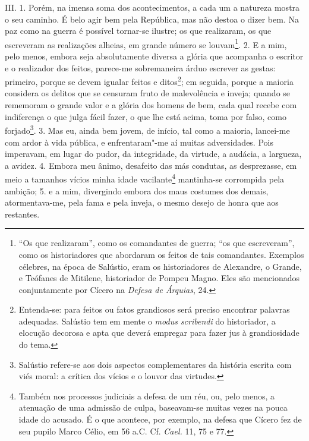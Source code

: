III. 1. Porém, na imensa soma dos acontecimentos, a cada um a natureza mostra o
seu caminho. É belo agir bem pela República, mas não destoa o dizer bem. Na paz
como na guerra é possível tornar-se ilustre; os que realizaram, os que
escreveram as realizações alheias, em grande número se louvam\footnote{``Os que
realizaram'', como os comandantes de guerra; ``os que escreveram'', como os
historiadores que abordaram os feitos de tais comandantes. Exemplos célebres,
na época de Salústio, eram os historiadores de Alexandre, o Grande, e Teófanes
de Mitilene, historiador de Pompeu Magno. Eles são mencionados conjuntamente
por Cícero na \emph{Defesa de Árquias}, 24.}. 2. E a mim, pelo menos, embora
seja absolutamente diversa a glória que acompanha o escritor e o realizador dos
feitos, parece-me sobremaneira árduo escrever as gestas: primeiro, porque se
devem igualar feitos e ditos\footnote{Entenda-se: para feitos ou fatos
grandiosos será preciso encontrar palavras adequadas. Salústio tem em mente o
\emph{modus scribendi} do historiador, a elocução decorosa e apta que deverá
empregar para fazer jus à grandiosidade do tema.}; em seguida, porque a maioria
considera os delitos que se censuram fruto de malevolência e inveja; quando se
rememoram o grande valor e a glória dos homens de bem, cada qual recebe com
indiferença o que julga fácil fazer, o que lhe está acima, toma por falso, como
forjado\footnote{Salústio refere-se aos dois aspectos complementares da
história escrita com viés moral: a crítica dos vícios e o louvor das
virtudes.}. 3. Mas eu, ainda bem jovem, de início, tal como a maioria,
lancei-me com ardor à vida pública, e enfrentaram"-me aí muitas adversidades.
Pois imperavam, em lugar do pudor, da integridade, da virtude, a audácia, a
largueza, a avidez. 4. Embora meu ânimo, desafeito das más condutas, as
desprezasse, em meio a tamanhos vícios minha idade vacilante\footnote{Também
nos processos judiciais a defesa de um réu, ou, pelo menos, a atenuação de uma
admissão de culpa, baseavam-se muitas vezes na pouca idade do acusado. É o que
acontece, por exemplo, na defesa que Cícero fez de seu pupilo Marco Célio, em
56 a.C. Cf. \emph{Cael.} 11, 75 e 77.} mantinha-se corrompida pela ambição; 5. e a mim, divergindo embora dos
maus costumes dos demais, atormentava-me, pela fama e pela inveja, o mesmo
desejo de honra que aos restantes.


